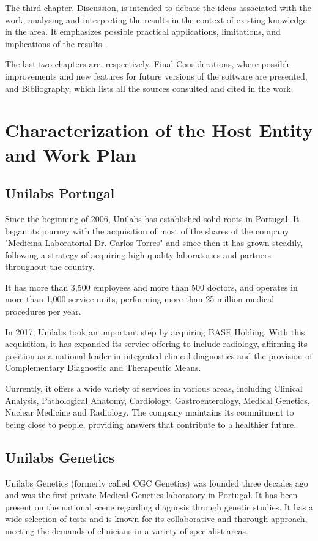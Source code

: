 The third chapter, Discussion, is intended to debate the ideas associated with the work, analysing and interpreting the results in the context of existing knowledge in the area. It emphasizes possible practical applications, limitations, and implications of the results. 

The last two chapters are, respectively, Final Considerations, where possible improvements and new features for future versions of the software are presented, and Bibliography, which lists all the sources consulted and cited in the work.

\section{Characterization of the Host Entity and Work Plan}
\subsection{Unilabs Portugal}

Since the beginning of 2006, Unilabs has established solid roots in Portugal. It began its journey with the acquisition of most of the shares of the company "Medicina Laboratorial Dr. Carlos Torres" and since then it has grown steadily, following a strategy of acquiring high-quality laboratories and partners throughout the country. 

It has more than 3,500 employees and more than 500 doctors, and operates in more than 1,000 service units, performing more than 25 million medical procedures per year. 

In 2017, Unilabs took an important step by acquiring BASE Holding. With this acquisition, it has expanded its service offering to include radiology, affirming its position as a national leader in integrated clinical diagnostics and the provision of Complementary Diagnostic and Therapeutic Means. 

Currently, it offers a wide variety of services in various areas, including Clinical Analysis, Pathological Anatomy, Cardiology, Gastroenterology, Medical Genetics, Nuclear Medicine and Radiology. The company maintains its commitment to being close to people, providing answers that contribute to a healthier future. \cite{unilabs_sobre}

\subsection{Unilabs Genetics}
Unilabs Genetics (formerly called CGC Genetics) was founded three decades ago and was the first private Medical Genetics laboratory in Portugal. It has been present on the national scene regarding diagnosis through genetic studies. It has a wide selection of tests and is known for its collaborative and thorough approach, meeting the demands of clinicians in a variety of specialist areas. 

